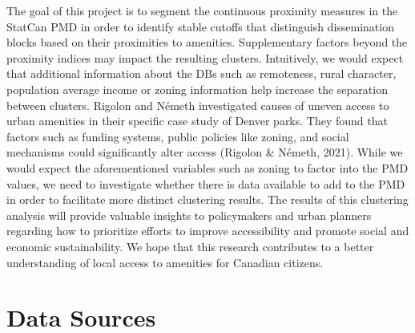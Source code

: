 \documentclass[11pt, a4paper]{article}
\begin{document}
The goal of this project is to segment the continuous proximity measures in the StatCan PMD in order to identify stable cutoffs that distinguish dissemination blocks based on their proximities to amenities. Supplementary factors beyond the proximity indices may impact the resulting clusters. Intuitively, we would expect that additional information about the DBs such as remoteness, rural character, population average income or zoning information help increase the separation between clusters. Rigolon and Németh investigated causes of uneven access to urban amenities in their specific case study of Denver parks. They found that factors such as funding systems, public policies like zoning, and social mechanisms could significantly alter access (Rigolon \& Németh, 2021). While we would expect the aforementioned variables such as zoning to factor into the PMD values, we need to investigate whether there is data available to add to the PMD in order to facilitate more distinct clustering results. The results of this clustering analysis will provide valuable insights to policymakers and urban planners regarding how to prioritize efforts to improve accessibility and promote social and economic sustainability. We hope that this research contributes to a better understanding of local access to amenities for Canadian citizens.





\section*{Data Sources}
\end{document}
